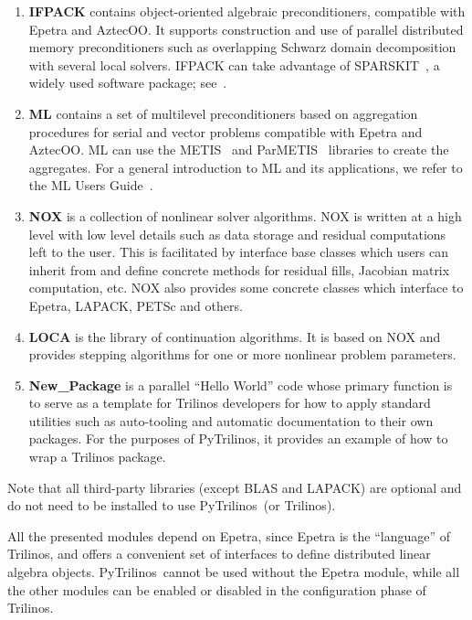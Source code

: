 \documentclass[acmtocl]{acmtrans2m}
\newcommand{\PyTrilinos}{{PyTrilinos}}
\begin{document}
\begin{enumerate}
\item {\bf IFPACK} contains object-oriented algebraic preconditioners,
  compatible with Epetra and AztecOO.  It supports construction and
  use of parallel distributed memory preconditioners such as
  overlapping Schwarz domain decomposition with several local solvers.
  IFPACK can take advantage of SPARSKIT~\cite{sparskit}, a widely used
  software package; see~\cite{ifpack-guide}.

\item {\bf ML} contains a set of multilevel preconditioners based on
  aggregation procedures for serial and vector problems compatible
  with Epetra and AztecOO.  ML can use the METIS~\cite{metis} and
  ParMETIS~\cite{parmetis} libraries to create the aggregates.  For a
  general introduction to ML and its applications, we refer to the ML
  Users Guide~\cite{ml-guide}.

\item {\bf NOX} is a collection of nonlinear solver algorithms.  NOX
  is written at a high level with low level details such as data
  storage and residual computations left to the user.  This is
  facilitated by interface base classes which users can inherit from
  and define concrete methods for residual fills, Jacobian matrix
  computation, etc.  NOX also provides some concrete classes which
  interface to Epetra, LAPACK, PETSc and others.

\item {\bf LOCA} is the library of continuation algorithms.  It is
  based on NOX and provides stepping algorithms for one or more
  nonlinear problem parameters.

\item {\bf New\_Package} is a parallel ``Hello World'' code whose
  primary function is to serve as a template for Trilinos developers
  for how to apply standard utilities such as auto-tooling and
  automatic documentation to their own packages.  For the purposes of
  \PyTrilinos, it provides an example of how to wrap a Trilinos
  package.

\end{enumerate}

Note that all third-party libraries (except BLAS and LAPACK) are
optional and do not need to be installed to use \PyTrilinos\ (or
Trilinos).

All the presented modules depend on Epetra, since Epetra is the
``language'' of Trilinos, and offers a convenient set of interfaces to
define distributed linear algebra objects.  \PyTrilinos\ cannot be
used without the Epetra module, while all the other modules can be
enabled or disabled in the configuration phase of Trilinos.
\end{document}
